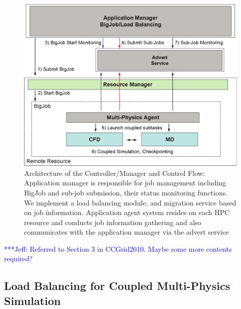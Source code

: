 \documentclass[conference,final]{IEEEtran}
\newcommand{\skonote}[1]{ {\textcolor{blue} { ***Jeff: #1 }}}
\newcommand{\skonote}[1]{}
\begin{document}
\begin{figure}
\centering
\includegraphics[scale=0.38]{Structure_of_BigJob}
\caption{\small Architecture of the Controller/Manager and Control Flow: Application manager is responsible for job management including BigJob and sub-job submission, their status monitoring functions. We implement a load balancing module, and migration service based on job information. Application agent system resides on each HPC resource and conducts job information gathering and also communicates with the application manager via the advert service}
\label{Fig:BigJob_Structure}
\vspace{-1em}
\end{figure}


\skonote{Referred to Section 3 in CCGrid2010. Maybe some more contents required?}
\newline
\newline


\subsection{Load Balancing for Coupled Multi-Physics Simulation}
\end{document}

